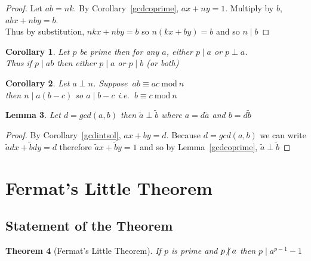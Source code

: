 \documentclass[12pt]{extarticle}
\renewcommand\qedsymbol{$\square$}
\newcommand{\divides}{\mid}
\newcommand{\ndivides}{\centernot \mid}
\newtheorem{theorem}{Theorem}[section]
\newtheorem{lemma}[theorem]{Lemma}
\newtheorem{corollary}[theorem]{Corollary}
\newenvironment{lproof}{\begin{proof} \renewcommand{\qedsymbol}{}}{\end{proof}}
\renewcommand{\mod}[3]{\: #1 \equiv #2 \: \mathrm{mod} \: #3 \:}
\begin{document}
\begin{lproof}
Let $ab = nk$.
By Corollary~\ref{gcdcoprime}, $ax+ny = 1$. Multiply by $b$, $abx + nby = b$. \\
Thus by substitution, $nkx + nby = b$ so $n(kx+by) = b$ and so $n \divides b$
\end{lproof}

\begin{corollary}
Let $p$ be prime then for any $a$, either $p \divides a$ or $p \perp a$.\\ Thus if $p \divides ab$ then either $p \divides a$ or $p \divides b$ (or both)
\end{corollary}

\begin{corollary}
\label{congruencecancelation}
Let $a \perp n$. Suppose $\mod{ab}{ac}{n}$ \\ then $n \divides a(b-c)$ so $a \divides b-c$  i.e. $\mod{b}{c}{n}$
\end{corollary}

\begin{lemma}
\label{coprimeresidues}
Let $d = gcd(a,b)$ then $\tilde{a} \perp \tilde{b}$ where $a = d\tilde{a}$ and $b = d\tilde{b}$
\end{lemma}

\begin{lproof}
By Corollary~\ref{gcdintsol}, $ax + by = d$. Because $d = gcd(a,b)$ we can write $\tilde{a}dx + \tilde{b}dy = d$ therefore $\tilde{a}x + \tilde{b}y = 1$ and so by Lemma~\ref{gcdcoprime}, $\tilde{a} \perp \tilde{b}$
\end{lproof}


\section{Fermat's Little Theorem}
\subsection{Statement of the Theorem}

\begin{theorem}[Fermat's Little Theorem]
If $p$ is prime and $p \ndivides a$ then $p \divides a^{p-1} - 1$
\end{theorem}
\end{document}
